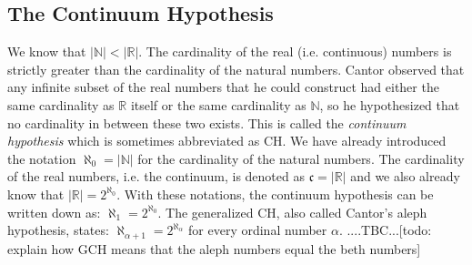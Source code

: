 

\subsection{The Continuum Hypothesis}
We know that $|\mathbb{N}| < |\mathbb{R}|$. The cardinality of the real (i.e. continuous) numbers is strictly greater than the cardinality of the natural numbers. Cantor observed that any infinite subset of the real numbers that he could construct had either the same cardinality as $\mathbb{R}$ itself or the same cardinality as $\mathbb{N}$, so he hypothesized that no cardinality in between these two exists. This is called the \emph{continuum hypothesis} which is sometimes abbreviated as CH. We have already introduced the notation $\aleph_0 = |\mathbb{N}|$ for the cardinality of the natural numbers. The cardinality of the real numbers, i.e. the continuum, is denoted as $\mathfrak{c} = |\mathbb{R}|$ and we also already know that $|\mathbb{R}| = 2^{\aleph_0}$. With these notations, the continuum hypothesis can be written down as: $\aleph_1 = 2^{\aleph_0}$. The generalized CH, also called Cantor's aleph hypothesis, states: $\aleph_{\alpha+1} = 2^{\aleph_{\alpha}}$ for every ordinal number $\alpha$. ....TBC...[todo: explain how GCH means that the aleph numbers equal the beth numbers]






